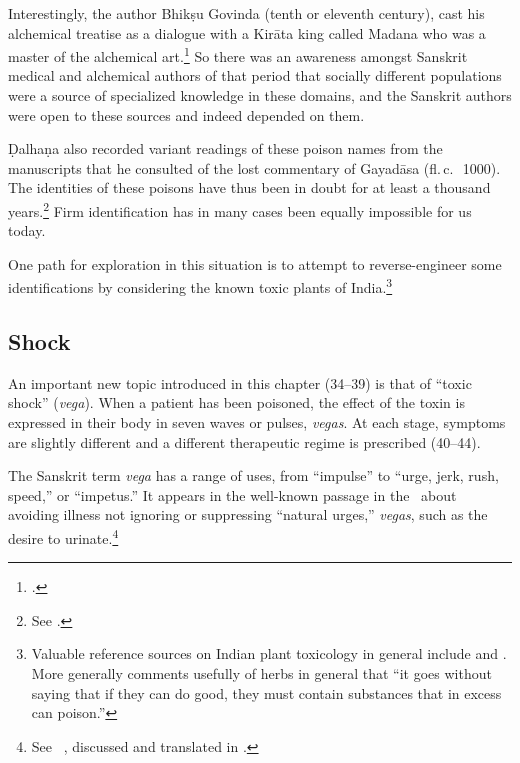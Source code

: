 Interestingly, the author Bhikṣu Govinda (tenth or eleventh century),
cast his alchemical treatise as a dialogue with a Kirāta king called
Madana who was a master of the alchemical art.\footcite[IIA,
620]{meul-hist}  So there was an awareness amongst Sanskrit medical and 
alchemical authors of that period that socially different populations were a 
source of specialized knowledge in these domains, and the Sanskrit authors 
were open to these sources and indeed depended on them.

Ḍalhaṇa also recorded variant readings of these poison names from the
manuscripts that he consulted of the lost commentary of Gayadāsa
(fl.\,c.\,\AD\ 1000). The identities of these poisons have thus been
in doubt for at least a thousand years.\footnote{See
    \cite[80--81]{wuja-2003}.} Firm identification has in many cases been
    equally impossible for us today.

One path for exploration in this situation is to attempt to
reverse-engineer some identifications by considering the known toxic
plants of India.\footnote{Valuable reference sources on Indian plant
    toxicology in general include \cite[chs.\,10, 11]{pill-2013} and
    \cite[parts 1.II, 3 and 4]{barc-2008}. More generally \citet[41 et
    passim]{bown-2001} comments usefully of herbs in general that “it
    goes without saying that if they can do good, they must contain
    substances that in excess can poison.”}

\subsection{Shock}

An important new topic introduced in this chapter (34--39) is that of “toxic
shock” (\emph{vega}).  When a patient has been 
poisoned, the effect of the toxin is expressed in their body in seven waves or 
pulses, \emph{vegas}.  At each stage, symptoms are slightly different and a 
different therapeutic regime is prescribed (40--44).  

The Sanskrit term \emph{vega} has a range of uses, from “impulse” to
“urge, jerk, rush, speed,” or “impetus.”  It appears in the
well-known passage in the \CS\ about avoiding illness not ignoring 
or suppressing “natural urges,” \emph{vegas}, such
as the desire to urinate.\footnote{See \CS\ , discussed and
    translated in \cite[7--8, 15--17]{wuja-2003}.}
    
